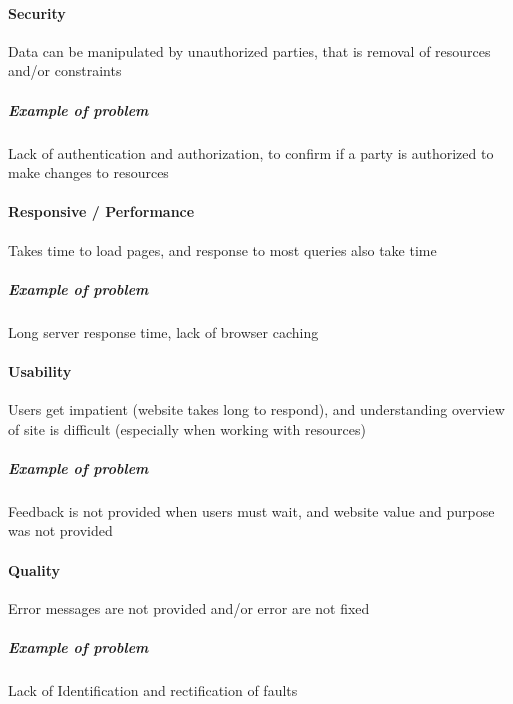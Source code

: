 
\paragraph{Security}
	Data can be manipulated by unauthorized parties, that is removal of resources and/or constraints
	\subparagraph{Example of problem}
		Lack of authentication and authorization, to confirm if a party is authorized to make changes to resources
		
\paragraph{Responsive / Performance}
Takes time to load pages, and response to most queries also take time
	\subparagraph{Example of problem}
		Long server response time, lack of browser caching


\paragraph{Usability}
Users get impatient (website takes long to respond), and understanding overview of site is difficult (especially when working with resources)
	\subparagraph{Example of problem}
		Feedback is not provided when users must wait, and website value and purpose was not provided
		
\paragraph{Quality}
Error messages are not provided and/or error are not fixed
	\subparagraph{Example of problem}
		Lack of Identification and rectification of faults

